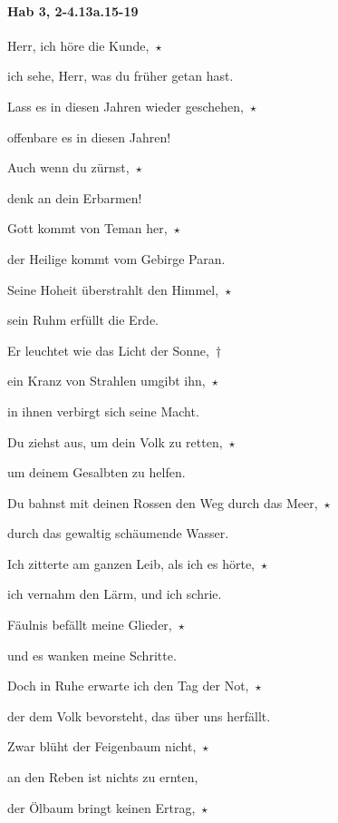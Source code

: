 \paragraph{Hab 3, 2-4.13a.15-19}

\noindent Herr, ich höre die Kunde,~$\star$~\nopagebreak

ich sehe, Herr, was du früher getan hast. 

\noindent Lass es in diesen Jahren wieder geschehen,~$\star$~\nopagebreak

offenbare es in diesen Jahren! 

\noindent Auch wenn du zürnst,~$\star$~\nopagebreak

denk an dein Erbarmen!

\noindent Gott kommt von Teman her,~$\star$~\nopagebreak

der Heilige kommt vom Gebirge Paran. 

\noindent Seine Hoheit überstrahlt den Himmel,~$\star$~\nopagebreak

sein Ruhm erfüllt die Erde.

\noindent Er leuchtet wie das Licht der Sonne,~†~\nopagebreak

ein Kranz von Strahlen umgibt ihn,~$\star$~\nopagebreak

in ihnen verbirgt sich seine Macht.

\noindent Du ziehst aus, um dein Volk zu retten,~$\star$~\nopagebreak

um deinem Gesalbten zu helfen.

\noindent Du bahnst mit deinen Rossen den Weg durch das Meer,~$\star$~\nopagebreak

durch das gewaltig schäumende Wasser.

\noindent Ich zitterte am ganzen Leib, als ich es hörte,~$\star$~\nopagebreak

ich vernahm den Lärm, und ich schrie. 

\noindent Fäulnis befällt meine Glieder,~$\star$~\nopagebreak

und es wanken meine Schritte. 

\noindent Doch in Ruhe erwarte ich den Tag der Not,~$\star$~\nopagebreak

der dem Volk bevorsteht, das über uns herfällt.

\noindent Zwar blüht der Feigenbaum nicht,~$\star$~\nopagebreak

an den Reben ist nichts zu ernten, 

\noindent der Ölbaum bringt keinen Ertrag,~$\star$~\nopagebreak

